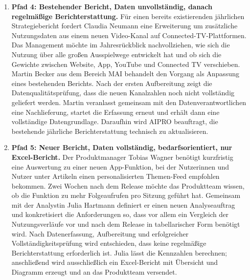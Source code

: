 \documentclass[11pt,a4paper]{article}
\begin{document}
\begin{enumerate}
  \item \textbf{Pfad 4: Bestehender Bericht, Daten unvollständig, danach regelmäßige Berichterstattung.} F\"ur einen bereits existierenden j\"ahrlichen Strategiebericht fordert Claudia Neumann eine Erweiterung um zus\"atzliche Nutzungsdaten aus einem neuen Video-Kanal auf Connected-TV-Plattformen. Das Management m\"ochte im Jahresr\"uckblick nachvollziehen, wie sich die Nutzung \"uber alle gro{\ss}en Ausspielwege entwickelt hat und ob sich die Gewichte zwischen Website, App, YouTube und Connected TV verschieben. Martin Becker aus dem Bereich MAI behandelt den Vorgang als Anpassung eines bestehenden Berichts. Nach der ersten Aufbereitung zeigt die Datenqualit\"atspr\"ufung, dass die neuen Kanalzahlen noch nicht vollst\"andig geliefert werden. Martin veranlasst gemeinsam mit den Datenverantwortlichen eine Nachlieferung, startet die Erfassung erneut und erh\"alt dann eine vollst\"andige Datengrundlage. Daraufhin wird AIPRO beauftragt, die bestehende j\"ahrliche Berichterstattung technisch zu aktualisieren.

  \item \textbf{Pfad 5: Neuer Bericht, Daten vollständig, bedarfsorientiert, nur Excel-Bericht.} Der Produktmanager Tobias Wagner ben\"otigt kurzfristig eine Auswertung zu einer neuen App-Funktion, bei der Nutzerinnen und Nutzer unter Artikeln einen personalisierten Themen-Feed empfohlen bekommen. Zwei Wochen nach dem Release m\"ochte das Produktteam wissen, ob die Funktion zu mehr Folgeaufrufen pro Sitzung gef\"uhrt hat. Gemeinsam mit der Analystin Julia Hartmann definiert er einen neuen Analyseauftrag und konkretisiert die Anforderungen so, dass vor allem ein Vergleich der Nutzungsverl\"aufe vor und nach dem Release in tabellarischer Form ben\"otigt wird. Nach Datenerfassung, Aufbereitung und erfolgreicher Vollst\"andigkeitspr\"ufung wird entschieden, dass keine regelm\"a{\ss}ige Berichterstattung erforderlich ist. Julia l\"asst die Kennzahlen berechnen; anschlie{\ss}end wird ausschlie{\ss}lich ein Excel-Bericht mit \"Ubersicht und Diagramm erzeugt und an das Produktteam versendet.


\end{enumerate}
\end{document}
